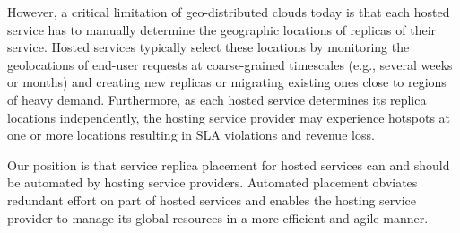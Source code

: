 {However, a critical limitation of geo-distributed clouds today is that each hosted service has to manually determine the geographic locations of replicas of their service. Hosted services typically select these locations by monitoring the geolocations of end-user requests at coarse-grained timescales (e.g., several weeks or months) and creating new replicas or migrating existing ones close to regions of heavy demand. Furthermore, as each hosted service determines its replica locations independently, the hosting service provider may experience hotspots at one or more locations resulting in SLA violations and revenue loss.

Our position is that service replica placement for hosted services can and should be automated by hosting service providers. Automated placement obviates redundant effort on part of hosted services and enables the hosting service provider to manage its global resources in a more efficient and agile manner.
}


